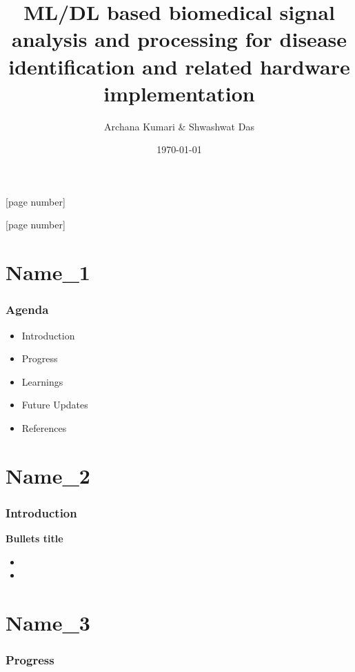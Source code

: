 \documentclass{beamer}
\title[Biomedical Signal Analysis]{ML/DL based biomedical signal analysis and processing for disease identification and related hardware implementation } %
\author[Archana Kumari \& Shwashwat Das]{Archana Kumari \& Shwashwat Das}
\institute[STUDENT ID] %
{

{\small Supervisor} \\
\medskip
{\small Prof. Sumitra Mukhopadhyay }\\
\vspace{0.5cm}
Institute of Radiophysics and Electronics\\
University of Calcutta

}
\date[\today]{\today}
\begin{document}
\begin{frame}
\titlepage %
[page number]

\end{frame}
[page number]



\section{Name\_1} 
\begin{frame}[allowframebreaks]
\frametitle{Agenda}
\begin{itemize}
\item {Introduction}
\vspace{0.15cm}
\item {Progress}
\vspace{0.15cm}
\item {Learnings}
\vspace{0.15cm}
\item {Future Updates}
\vspace{0.15cm}
\item {References}
\end{itemize}

\end{frame}



\section{Name\_2}
\begin{frame}[allowframebreaks]
\frametitle{Introduction}
\textbf{Bullets title}
\vspace{0.3cm}
\begin{itemize}
\item 
\vspace{0.15cm}
\item 
\end{itemize}

\end{frame}


\section{Name\_3}
\begin{frame}[allowframebreak]
\frametitle{Progress}\small

\end{frame}
\end{document}
